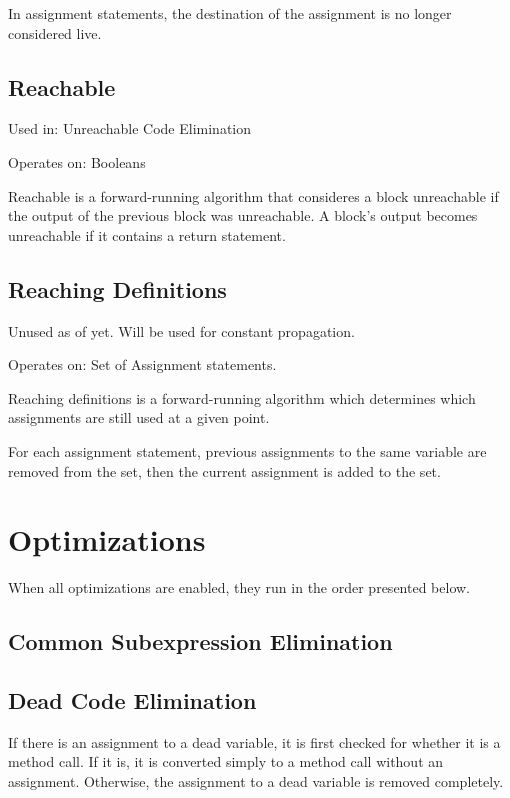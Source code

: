 \documentclass[11pt]{article}
\begin{document}
  In assignment statements, the destination of the assignment is no longer considered live.
\subsection{Reachable}
\label{sec-2-3}

  Used in: Unreachable Code Elimination

  Operates on: Booleans

  Reachable is a forward-running algorithm that consideres a block unreachable if the output of the previous
  block was unreachable. A block's output becomes unreachable if it contains a return statement.
\subsection{Reaching Definitions}
\label{sec-2-4}

  Unused as of yet. Will be used for constant propagation.

  Operates on: Set of Assignment statements.

  Reaching definitions is a forward-running algorithm which determines which assignments are still used
  at a given point.

  For each assignment statement, previous assignments to the same variable are removed from the set,
  then the current assignment is added to the set.
  
\section{Optimizations}
\label{sec-3}

  When all optimizations are enabled, they run in the order presented below.
\subsection{Common Subexpression Elimination}
\label{sec-3-1}

  
\subsection{Dead Code Elimination}
\label{sec-3-2}

  If there is an assignment to a dead variable, it is first checked for whether it is a method call. 
  If it is, it is converted simply to a method call without an assignment. Otherwise, the assignment
  to a dead variable is removed completely.
\end{document}
